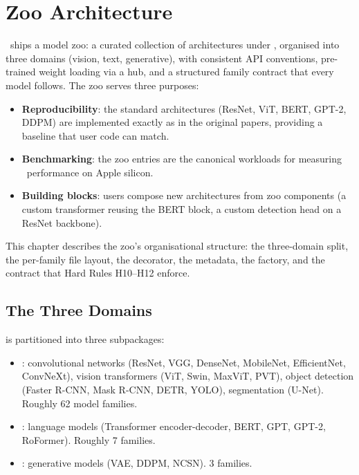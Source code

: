 \chapter{Zoo Architecture}
\label{ch:zoo_architecture}

\Lucid\ ships a model zoo: a curated collection of architectures
under , organised into three domains (vision,
text, generative), with consistent API conventions, pre-trained
weight loading via a hub, and a structured family contract that
every model follows. The zoo serves three purposes:

\begin{itemize}
  \item \textbf{Reproducibility}: the standard architectures
    (ResNet, ViT, BERT, GPT-2, DDPM) are implemented exactly as
    in the original papers, providing a baseline that user code
    can match.
  \item \textbf{Benchmarking}: the zoo entries are the
    canonical workloads for measuring \Lucid\ performance on
    Apple silicon.
  \item \textbf{Building blocks}: users compose new architectures
    from zoo components (a custom transformer reusing the BERT
    block, a custom detection head on a ResNet backbone).
\end{itemize}

This chapter describes the zoo's organisational structure: the
three-domain split, the per-family file layout, the
 decorator, the 
metadata, the  factory, and the contract that
Hard Rules H10--H12 enforce.

\section{The Three Domains}
\label{sec:zoo_architecture:three_domains}

 is partitioned into three subpackages:

\begin{itemize}
  \item {}: convolutional networks (ResNet,
    VGG, DenseNet, MobileNet, EfficientNet, ConvNeXt), vision
    transformers (ViT, Swin, MaxViT, PVT), object detection
    (Faster R-CNN, Mask R-CNN, DETR, YOLO), segmentation
    (U-Net). Roughly 62 model families.
  \item {}: language models (Transformer
    encoder-decoder, BERT, GPT, GPT-2, RoFormer). Roughly 7
    families.
  \item {}: generative models (VAE,
    DDPM, NCSN). 3 families.
\end{itemize}

